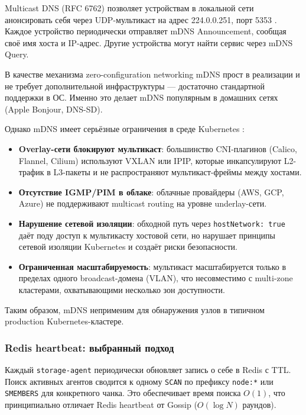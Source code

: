 Multicast DNS (RFC 6762) позволяет устройствам в локальной сети анонсировать себя через UDP-мультикаст на адрес 224.0.0.251, порт 5353 \cite{mdns_k8s_limitations}. Каждое устройство периодически отправляет mDNS Announcement, сообщая своё имя хоста и IP-адрес. Другие устройства могут найти сервис через mDNS Query.

В качестве механизма zero-configuration networking mDNS прост в реализации и не требует дополнительной инфраструктуры --- достаточно стандартной поддержки в ОС. Именно это делает mDNS популярным в домашних сетях (Apple Bonjour, DNS-SD).

Однако mDNS имеет серьёзные ограничения в среде Kubernetes \cite{mdns_k8s_limitations}:
\begin{itemize}[leftmargin=*]
  \item \textbf{Overlay-сети блокируют мультикаст}: большинство CNI-плагинов (Calico, Flannel, Cilium) используют VXLAN или IPIP, которые инкапсулируют L2-трафик в L3-пакеты и не распространяют мультикаст-фреймы между хостами.
  \item \textbf{Отсутствие IGMP/PIM в облаке}: облачные провайдеры (AWS, GCP, Azure) не поддерживают multicast routing на уровне underlay-сети.
  \item \textbf{Нарушение сетевой изоляции}: обходной путь через \texttt{hostNetwork: true} даёт поду доступ к мультикасту хостовой сети, но нарушает принципы сетевой изоляции Kubernetes и создаёт риски безопасности.
  \item \textbf{Ограниченная масштабируемость}: мультикаст масштабируется только в пределах одного broadcast-домена (VLAN), что несовместимо с multi-zone кластерами, охватывающими несколько зон доступности.
\end{itemize}

Таким образом, mDNS неприменим для обнаружения узлов в типичном production Kubernetes-кластере.

\subsubsection{Redis heartbeat: выбранный подход}

Каждый \texttt{storage-agent} периодически обновляет запись о себе в Redis с TTL. Поиск активных агентов сводится к одному \texttt{SCAN} по префиксу \texttt{node:*} или \texttt{SMEMBERS} для конкретного чанка. Это обеспечивает время поиска $O(1)$, что принципиально отличает Redis heartbeat от Gossip ($O(\log N)$ раундов).

